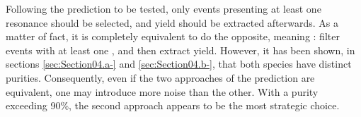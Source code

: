 Following the prediction to be tested, only events presenting at least one \rmPhiMes resonance should be selected, and \rmOmega yield should be extracted afterwards. As a matter of fact, it is completely equivalent to do the opposite, meaning : filter events with at least one \rmOmega, and then extract \rmPhiMes yield. However, it has been shown, in sections \ref{sec:Section04.a-} and \ref{sec:Section04.b-}, that both species have distinct purities. Consequently, even if the two approaches of the \Pythiaeight prediction are equivalent, one may introduce more noise than the other. With a purity exceeding 90\%, the second approach appears to be the most strategic choice. 